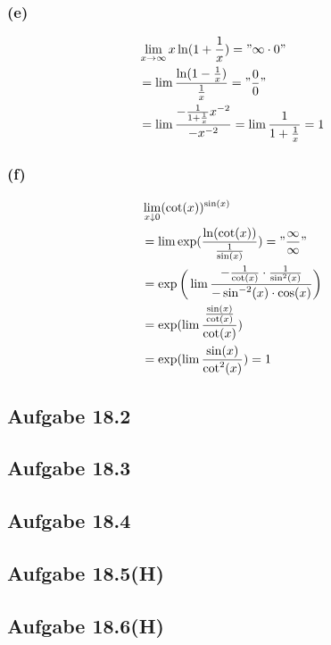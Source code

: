 \newpage

\subsubsection{(e)}
\begin{align*}
&\lim_{x\rightarrow\infty}x\ln(1+\frac{1}{x})="\infty\cdot0"\\
&=\lim\frac{\ln(1-\frac{1}{x})}{\frac{1}{x}}="\frac{0}{0}"\\
&=\lim\frac{-\frac{1}{1+\frac{1}{x}}x^{-2}}{-x^{-2}}=\lim\frac{1}{1+\frac{1}{x}}=1
\end{align*}

\subsubsection{(f)}
\begin{align*}
&\lim_{x\downarrow0}(\cot(x))^{\sin(x)}\\
&=\lim\exp(\frac{\ln(\cot(x))}{\frac{1}{\sin(x)}})="\frac{\infty}{\infty}"\\
&=\exp\bigg(\lim\frac{-\frac{1}{\cot(x)}\cdot\frac{1}{\sin^2(x)}}{-\sin^{-2}(x)\cdot\cos(x)}\bigg)\\
&=\exp(\lim\frac{\frac{\sin(x)}{\cot(x)}}{\cot(x)})\\
&=\exp(\lim\frac{\sin(x)}{\cot^2(x)})=1
\end{align*}

\newpage

\subsection{Aufgabe 18.2}

\subsection{Aufgabe 18.3}

\subsection{Aufgabe 18.4}

\subsection{Aufgabe 18.5(H)}

\subsection{Aufgabe 18.6(H)}

